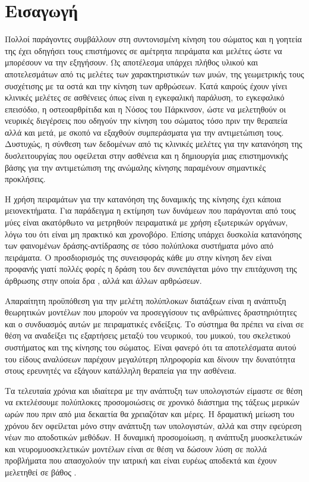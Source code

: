 \chapter{Εισαγωγή}

Πολλοί παράγοντες συμβάλλουν στη συντονισμένη κίνηση του σώματος και η γοητεία της έχει οδηγήσει τους επιστήμονες σε αμέτρητα πειράματα και μελέτες ώστε να μπορέσουν να την εξηγήσουν. Ως αποτέλεσμα υπάρχει πλήθος υλικού και αποτελεσμάτων από τις μελέτες των χαρακτηριστικών των μυών, της γεωμετρικής τους συσχέτισης με τα οστά και την κίνηση των αρθρώσεων. Κατά καιρούς έχουν γίνει κλινικές μελέτες σε ασθένειες όπως είναι η εγκεφαλική παράλυση, το εγκεφαλικό επεισόδιο, η οστεοαρθρίτιδα και η Νόσος του Πάρκινσον, ώστε να μελετηθούν οι νευρικές διεγέρσεις που οδηγούν την κίνηση του σώματος τόσο πριν την θεραπεία αλλά και μετά, με σκοπό να εξαχθούν συμπεράσματα για την αντιμετώπιση τους. Δυστυχώς, η σύνθεση των δεδομένων από τις κλινικές μελέτες για την κατανόηση της δυσλειτουργίας που οφείλεται στην ασθένεια και η δημιουργία μιας επιστημονικής βάσης για την αντιμετώπιση της ανώμαλης κίνησης παραμένουν σημαντικές προκλήσεις.

Η χρήση πειραμάτων για την κατανόηση της δυναμικής της κίνησης έχει κάποια μειονεκτήματα. Για παράδειγμα η εκτίμηση των δυνάμεων που παράγονται από τους μύες είναι ακατόρθωτο να μετρηθούν πειραματικά με χρήση εξωτερικών οργάνων, λόγω του ότι είναι μη πρακτικό και χρονοβόρο. Επίσης υπάρχει δυσκολία κατανόησης των φαινομένων δράσης-αντίδρασης σε τόσο πολύπλοκα συστήματα μόνο από πειράματα. Ο προσδιορισμός της συνεισφοράς κάθε μυ στην κίνηση δεν είναι προφανής γιατί πολλές φορές η δράση του δεν συνεπάγεται μόνο την επιτάχυνση της άρθρωσης στην οποία δρα \cite{zajac-gordon89}, αλλά και άλλων αρθρώσεων.

Απαραίτητη προϋπόθεση για την μελέτη πολύπλοκων διατάξεων είναι η ανάπτυξη θεωρητικών μοντέλων που μπορούν να προσεγγίσουν τις ανθρώπινες δραστηριότητες και ο συνδυασμός αυτών με πειραματικές ενδείξεις. Το σύστημα θα πρέπει να είναι σε θέση να αναδείξει τις εξαρτήσεις μεταξύ του νευρικού, του μυικού, του σκελετικού συστήματος και της κίνησης του σώματος. Είναι φανερό ότι τα αποτελέσματα αυτού του είδους αναλύσεων παρέχουν μεγαλύτερη πληροφορία και δίνουν την δυνατότητα στους ερευνητές να εξάγουν κατάλληλη θεραπεία για την ασθένεια.

Τα τελευταία χρόνια και ιδιαίτερα με την ανάπτυξη των υπολογιστών είμαστε σε θέση να εκτελέσουμε πολύπλοκες προσομοιώσεις σε χρονικό διάστημα της τάξεως μερικών ωρών που πριν από μια δεκαετία θα χρειαζόταν και μέρες. Η δραματική μείωση του χρόνου δεν οφείλεται μόνο στην ανάπτυξη των υπολογιστών, αλλά και στην εφεύρεση νέων πιο αποδοτικών μεθόδων. Η δυναμική προσομοίωση, η ανάπτυξη μυοσκελετικών και νευρομυοσκελετικών μοντέλων είναι σε θέση να δώσουν λύση σε πολλά προβλήματα που απασχολούν την ιατρική και είναι ευρέως αποδεκτά και έχουν μελετηθεί σε βάθος \cite{thelen-chumanov06, piazza06, pandy01, zajac02}.

